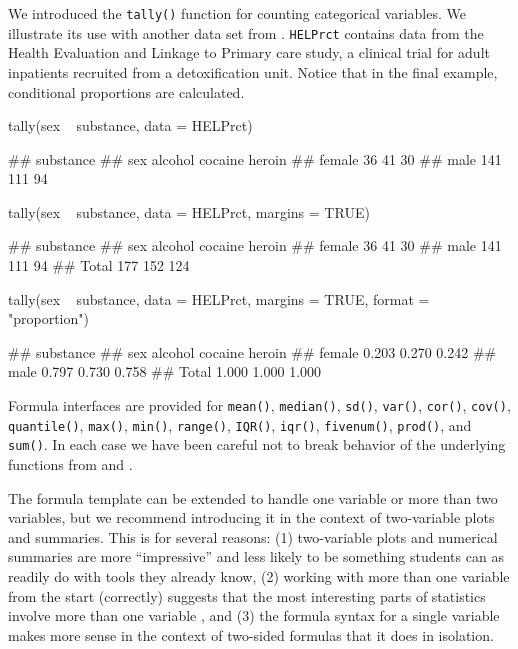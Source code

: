 \noindent
We introduced the \texttt{tally()} function for counting categorical
variables. We illustrate its use with another data set from
 \citep{mosaicData}. \texttt{HELPrct} contains data
from the Health Evaluation and Linkage to Primary care study, a clinical
trial for adult inpatients recruited from a detoxification unit. Notice
that in the final example, conditional proportions are calculated.

\begin{Schunk}
\begin{Sinput}
tally(sex ~ substance, data = HELPrct)
\end{Sinput}
\begin{Soutput}
##         substance
## sex      alcohol cocaine heroin
##   female      36      41     30
##   male       141     111     94
\end{Soutput}
\begin{Sinput}
tally(sex ~ substance, data = HELPrct, margins = TRUE)
\end{Sinput}
\begin{Soutput}
##         substance
## sex      alcohol cocaine heroin
##   female      36      41     30
##   male       141     111     94
##   Total      177     152    124
\end{Soutput}
\begin{Sinput}
tally(sex ~ substance, data = HELPrct, margins = TRUE, format = "proportion")
\end{Sinput}
\begin{Soutput}
##         substance
## sex      alcohol cocaine heroin
##   female   0.203   0.270  0.242
##   male     0.797   0.730  0.758
##   Total    1.000   1.000  1.000
\end{Soutput}
\end{Schunk}

Formula interfaces are provided for \texttt{mean()}, \texttt{median()},
\texttt{sd()}, \texttt{var()}, \texttt{cor()}, \texttt{cov()},
\texttt{quantile()}, \texttt{max()}, \texttt{min()}, \texttt{range()},
\texttt{IQR()}, \texttt{iqr()}, \texttt{fivenum()}, \texttt{prod()}, and
\texttt{sum()}. In each case we have been careful not to break behavior
of the underlying functions from  and .

The formula template can be extended to handle one variable or more than
two variables, but we recommend introducing it in the context of
two-variable plots and summaries. This is for several reasons: (1)
two-variable plots and numerical summaries are more ``impressive'' and
less likely to be something students can as readily do with tools they
already know, (2) working with more than one variable from the start
(correctly) suggests that the most interesting parts of statistics
involve more than one variable \citep{Wild:RSS:2011}, and (3) the
formula syntax for a single variable makes more sense in the context of
two-sided formulas that it does in isolation.

